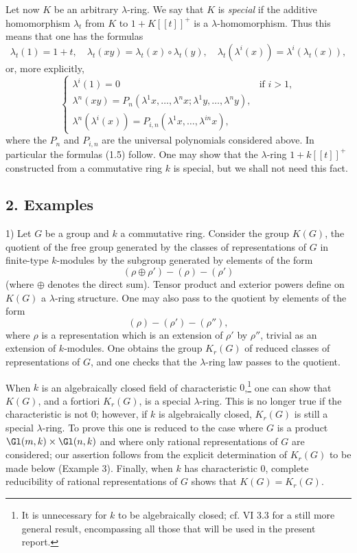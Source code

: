 Let now $K$ be an arbitrary $\lambda$-ring. We say that $K$ is \emph{special} if the additive homomorphism $\lambda_t$ from $K$ to $1+K[[t]]^+$ is a $\lambda$-homomorphism. Thus this means that one has the formulas
\begin{equation}\tag{1.10}
\lambda_t(1)=1+t,\quad
\lambda_t(xy)=\lambda_t(x)\circ\lambda_t(y),\quad
\lambda_t(\lambda^i(x))=\lambda^i(\lambda_t(x)),
\end{equation}
or, more explicitly,
\begin{equation}\tag{1.11}
\begin{cases}
\lambda^i(1)=0 & \text{if }i>1,\\
\lambda^n(xy)=P_n(\lambda^1x,\ldots,\lambda^n x;\lambda^1y,\ldots,\lambda^n y),\\
\lambda^n(\lambda^i(x))=P_{i,n}(\lambda^1x,\ldots,\lambda^{in}x),
\end{cases}
\end{equation}
where the $P_n$ and $P_{i,n}$ are the universal polynomials considered above. In particular the formulas (1.5) follow. One may show that the $\lambda$-ring $1+k[[t]]^+$ constructed from a commutative ring $k$ is special, but we shall not need this fact.

\subsection*{2. Examples}

1) Let $G$ be a group and $k$ a commutative ring. Consider the group $K(G)$, the quotient of the free group generated by the classes of representations of $G$ in finite-type $k$-modules by the subgroup generated by elements of the form
\[
(\rho\oplus\rho')-(\rho)-(\rho')
\]
(where $\oplus$ denotes the direct sum). Tensor product and exterior powers define on $K(G)$ a $\lambda$-ring structure. One may also pass to the quotient by elements of the form
\[
(\rho)-(\rho')-(\rho''),
\]
where $\rho$ is a representation which is an extension of $\rho'$ by $\rho''$, trivial as an extension of $k$-modules. One obtains the group $K_r(G)$ of reduced classes of representations of $G$, and one checks that the $\lambda$-ring law passes to the quotient.

When $k$ is an algebraically closed field of characteristic $0$,\footnote{It is unnecessary for $k$ to be algebraically closed; cf. VI 3.3 for a still more general result, encompassing all those that will be used in the present report.} one can show that $K(G)$, and a fortiori $K_r(G)$, is a special $\lambda$-ring. This is no longer true if the characteristic is not $0$; however, if $k$ is algebraically closed, $K_r(G)$ is still a special $\lambda$-ring. To prove this one is reduced to the case where $G$ is a product $\Gl(m,k)\times\Gl(n,k)$ and where only rational representations of $G$ are considered; our assertion follows from the explicit determination of $K_r(G)$ to be made below (Example 3). Finally, when $k$ has characteristic $0$, complete reducibility of rational representations of $G$ shows that $K(G)=K_r(G)$.

